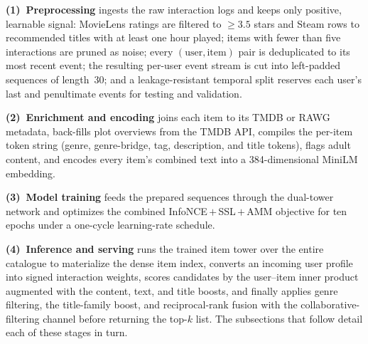 \textbf{(1)~Preprocessing} ingests the raw interaction logs and keeps only positive, learnable signal: MovieLens ratings are filtered to $\geq 3.5$ stars and Steam rows to recommended titles with at least one hour played; items with fewer than five interactions are pruned as noise; every $(\text{user},\text{item})$ pair is deduplicated to its most recent event; the resulting per-user event stream is cut into left-padded sequences of length~30; and a leakage-resistant temporal split reserves each user's last and penultimate events for testing and validation.

\textbf{(2)~Enrichment and encoding} joins each item to its TMDB or RAWG metadata, back-fills plot overviews from the TMDB API, compiles the per-item token string (genre, genre-bridge, tag, description, and title tokens), flags adult content, and encodes every item's combined text into a 384-dimensional MiniLM embedding.

\textbf{(3)~Model training} feeds the prepared sequences through the dual-tower network and optimizes the combined InfoNCE\,$+$\,SSL\,$+$\,AMM objective for ten epochs under a one-cycle learning-rate schedule.

\textbf{(4)~Inference and serving} runs the trained item tower over the entire catalogue to materialize the dense item index, converts an incoming user profile into signed interaction weights, scores candidates by the user--item inner product augmented with the content, text, and title boosts, and finally applies genre filtering, the title-family boost, and reciprocal-rank fusion with the collaborative-filtering channel before returning the top-$k$ list. The subsections that follow detail each of these stages in turn.

